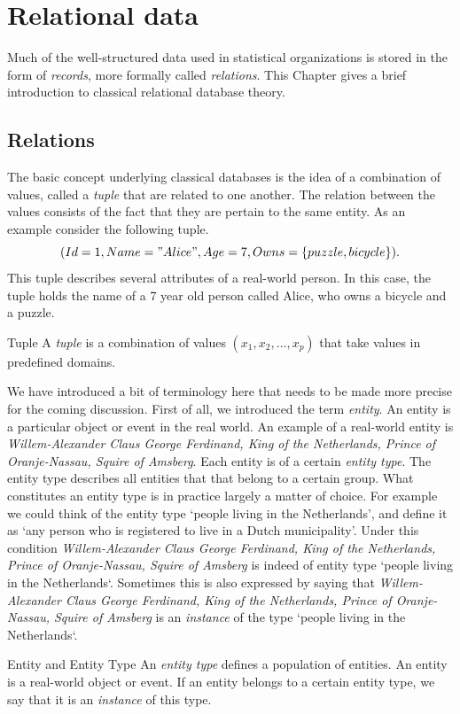 \chapter{Relational data}
\label{sect:relational}
Much of the well-structured data used in statistical organizations is stored in
the form of \emph{records}, more formally called \emph{relations}. This Chapter
gives a brief introduction to classical relational database theory.


\section{Relations}
The basic concept underlying classical databases is the idea of a combination
of values, called a \emph{tuple} that are related to one another. The relation
between the values consists of the fact that they are pertain to the same
entity. As an example consider the following tuple.
\begin{equation}
(Id=1, Name="Alice", Age=7, Owns=\{puzzle, bicycle\}).
\label{eq:alice}
\end{equation}
This tuple describes several attributes of a real-world person.  In this case,
the tuple holds the name of a 7 year old person called Alice, who owns a
bicycle and a puzzle.
\begin{terminology}{Tuple}
A \emph{tuple} is a combination of values $(x_1, x_2,\ldots, x_p)$ that take
values in predefined domains.
\end{terminology}
We have introduced a bit of terminology here that needs to be made more precise
for the coming discussion. First of all, we introduced the term \emph{entity}.
An entity is a particular object or event in the real world.  An example of a
real-world entity is \emph{Willem-Alexander Claus George Ferdinand, King of the
Netherlands, Prince of Oranje-Nassau, Squire of Amsberg}.  Each entity is of a
certain \emph{entity type}. The entity type describes all entities that that
belong to a certain group. What constitutes an entity type is in practice
largely a matter of choice. For example we could think of the entity type
`people living in the Netherlands', and define it as `any person who is
registered to live in a Dutch municipality'. Under this condition
\emph{Willem-Alexander Claus George Ferdinand, King of the Netherlands, Prince
of Oranje-Nassau, Squire of Amsberg} is indeed of entity type `people living in
the Netherlands`. Sometimes this is also expressed by saying that
\emph{Willem-Alexander Claus George Ferdinand, King of the Netherlands, Prince
of Oranje-Nassau, Squire of Amsberg} is an \emph{instance} of the type `people
living in the Netherlands`.
%
\begin{terminology}{Entity and Entity Type}
An \emph{entity type} defines a population of entities. An entity
is a real-world object or event. If an entity belongs to a certain
entity type, we say that it is an \emph{instance} of this type.
\end{terminology}

